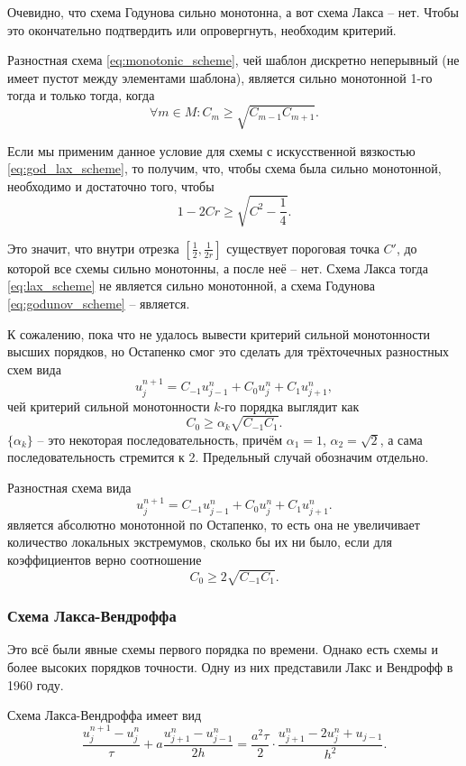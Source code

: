 \documentclass{article}
\begin{document}
Очевидно, что схема Годунова сильно монотонна, а вот схема Лакса -- нет. Чтобы
это окончательно подтвердить или опровергнуть, необходим критерий.

\begin{theorem}
	Разностная схема \eqref{eq:monotonic_scheme}, чей шаблон дискретно
	неперывный (не имеет пустот между элементами шаблона), является
	сильно монотонной 1-го тогда и только тогда, когда
	\[\forall m\in M: C_m\ge\sqrt{C_{m-1}C_{m+1}}.\]
\end{theorem}

\noproof

Если мы применим данное условие для схемы с искусственной вязкостью
\eqref{eq:god_lax_scheme}, то получим, что, чтобы схема была сильно монотонной,
необходимо и достаточно того, чтобы
\[1-2Cr\ge\sqrt{C^2-\frac{1}{4}}.\]

Это значит, что внутри отрезка $[\frac{1}{2},\frac{1}{2r}]$ существует пороговая
точка $C'$, до которой все схемы сильно монотонны, а после неё -- нет. Схема
Лакса тогда \eqref{eq:lax_scheme} не является сильно монотонной, а схема
Годунова \eqref{eq:godunov_scheme} -- является.

К сожалению, пока что не удалось вывести критерий сильной монотонности высших
порядков, но Остапенко смог это сделать для трёхточечных разностных схем вида
\[u_j^{n+1}=C_{-1}u_{j-1}^n+C_0u_j^n+C_1u_{j+1}^n,\]
чей критерий сильной монотонности $k$-го порядка выглядит как
\[C_0\ge\alpha_k\sqrt{C_{-1}C_1}.\]
$\{\alpha_k\}$ -- это некоторая последовательность,
причём $\alpha_1=1$, $\alpha_2=\sqrt 2$, а сама последовательность стремится к
2. Предельный случай обозначим отдельно.

\begin{theorem}
	Разностная схема вида
	\[u_j^{n+1}=C_{-1}u_{j-1}^n+C_0u_j^n+C_1u_{j+1}^n.\]
	является абсолютно монотонной по Остапенко, то есть она не увеличивает
	количество локальных экстремумов, сколько бы их ни было, если для
	коэффициентов верно соотношение
	\[C_0\ge 2\sqrt{C_{-1}C_1}.\]
\end{theorem}

\subsubsection{Схема Лакса-Вендроффа}
Это всё были явные схемы первого порядка по времени. Однако есть схемы и более
высоких порядков точности. Одну из них представили Лакс и Вендрофф в 1960 году.

\begin{lemma}\label{eq:lax_wendruff_scheme}
	Схема Лакса-Вендроффа имеет вид
	\[\frac{u_j^{n+1}-u_j^n}{\tau}+a\frac{u_{j+1}^n-u_{j-1}^n}{2h}=
	\frac{a^2\tau}{2}\cdot\frac{u_{j+1}^n-2u_j^n+u_{j-1}}{h^2}.\]
\end{lemma}
\end{document}
